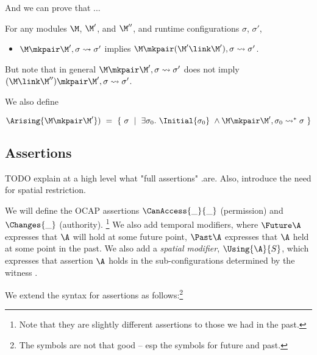 And we can prove that ...

\begin{lemma}[xxx]
\label{lamma:module_pair_execution} 
For any modules $\M$, $\M'$, and $\M''$, and runtime configurations $\sigma$, $\sigma'$, 

\begin{itemize}
\item
 $\M \mkpair \M', \sigma \leadsto \sigma'$  implies $\M \mkpair (\M'\link\M') ,\sigma \leadsto \sigma'$.
\end{itemize}
\end{lemma} 

But note that in general $\M \mkpair \M', \sigma \leadsto \sigma'$  does not imply
$(\M\link\M'') \mkpair \M' , \sigma \leadsto \sigma'$.


We also define 
\begin{definition}
$\Arising  {\M\mkpair\M'}) \ = \ \{ \ \sigma \ \mid \ \exists \sigma_0. \  \Initial{\sigma_0} \ \wedge  \M\mkpair\M', \sigma_0 \leadsto^* \sigma \ \} $
\end{definition}
 
 \subsection{Assertions}

TODO explain at a high level what "full assertions" .are. Also, introduce the need  for spatial restriction. 

We will define the OCAP assertions $\CanAccess{\_}{\_}$  (permission)
and   $\Changes{\_}$ (authority). \footnote{Note that they are slightly different
assertions to those we had in the past.}
We also add temporal modifiers, where $\Future \A$ expresses that $\A$ will hold at some future point,
$\Past \A$ expresses that $\A$ held at some point in the past.
We also add a {\em spatial modifier}, $\Using{\A}{S}$, which expresses that assertion $\A$ holds in
the sub-configurations determined by the witness .

We extend the syntax for assertions as follows:\footnote{The symbols are not that good -- esp the symbols for future and past.}

